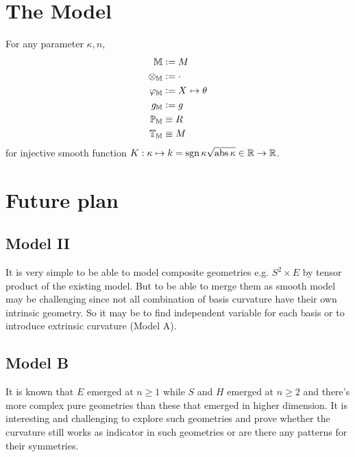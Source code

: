 \documentclass[stu, babel, american, biblatex, a4paper, draftall]{apa7}
\begin{document}
\section{The Model}
\begin{ModelGroupElement}
    For any parameter $\kappa, n$,
    \begin{align*}
        \elements                   & \defeq M                                    \\
        \groupoperation{\elements}  & \defeq \cdot                                \\
        \charts{\elements}          & \defeq \tensor{X}{}\mapsto\tensor{\theta}{} \\
        \innerprod{\elements}       & \defeq g                                    \\
        \points{\elements}          & \equiv R                                    \\
        \transformations{\elements} & \equiv M                                    \\
    \end{align*}
    for injective smooth function $K:\kappa \mapsto k = \operatorname{sgn}{\kappa}\sqrt{\operatorname{abs}{\kappa}}\in\mathbb{R}\to\mathbb{R}$.
\end{ModelGroupElement}
\begin{ModelGroupAssertion}
\end{ModelGroupAssertion}
\begin{ModelCurvatureAssertion}
\end{ModelCurvatureAssertion}
\section{Future plan}
\subsection{Model II}
It is very simple to be able to model composite geometries e.g. $S^2 \times E$ by tensor product of the existing model. But to be able to merge them as smooth model may be challenging since not all combination of basis curvature have their own intrinsic geometry. So it may be to find independent variable for each basis or to introduce extrinsic curvature (Model A).
\subsection{Model B}
It is known that $E$ emerged at $n\ge1$ while $S$ and $H$ emerged at $n\ge2$ and there's more complex pure geometries than these that emerged in higher dimension. It is interesting and challenging to explore such geometries and prove whether the curvature still works as indicator in such geometries or are there any patterns for their symmetries.
\end{document}
